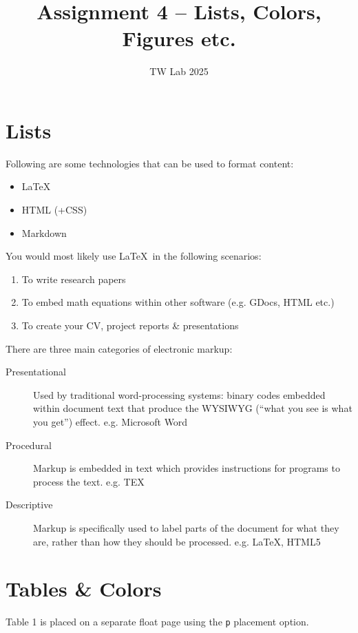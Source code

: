 \documentclass[12pt,a4paper]{article}
\title{Assignment 4 -- Lists, Colors, Figures etc.}
\author{TW Lab 2025}
\date{}
\begin{document}
\maketitle

\section{Lists}

Following are some technologies that can be used to format content:

\begin{itemize}
    \item \LaTeX
    \item HTML (+CSS)
    \item Markdown
\end{itemize}

You would most likely use \LaTeX\ in the following scenarios:

\begin{enumerate}
    \item To write research papers
    \item To embed math equations within other software (e.g. GDocs, HTML etc.)
    \item To create your CV, project reports \& presentations
\end{enumerate}

There are three main categories of electronic markup:

\begin{description}
    \item[Presentational] Used by traditional word-processing systems: binary codes embedded within document text that produce the WYSIWYG (``what you see is what you get'') effect. e.g. Microsoft Word
    \item[Procedural] Markup is embedded in text which provides instructions for programs to process the text. e.g. TEX
    \item[Descriptive] Markup is specifically used to label parts of the document for what they are, rather than how they should be processed. e.g. \LaTeX, HTML5
\end{description}

\section{Tables \& Colors}

Table 1 is placed on a separate float page using the \texttt{p} placement option.
\end{document}

